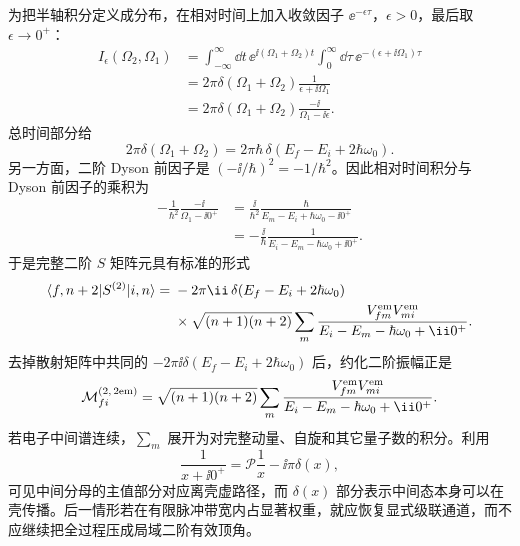 \begin{derivation}
为把半轴积分定义成分布，在相对时间上加入收敛因子 $\ee^{-\epsilon\tau}$，$\epsilon>0$，最后取 $\epsilon\to0^+$：
\begin{align*}
 I_\epsilon(\Omega_2,\Omega_1)
 &=\int_{-\infty}^{\infty}\dd t\,
   \ee^{\ii(\Omega_1+\Omega_2)t}
   \int_0^\infty\dd\tau\,
   \ee^{-(\epsilon+\ii\Omega_1)\tau}\\
 &=2\pi\delta(\Omega_1+\Omega_2)
   \frac1{\epsilon+\ii\Omega_1}\\
 &=2\pi\delta(\Omega_1+\Omega_2)
   \frac{-\ii}{\Omega_1-\ii\epsilon}.
\end{align*}
总时间部分给
\begin{equation*}
2\pi\delta(\Omega_1+\Omega_2)
=2\pi\hbar\,
\delta(E_f-E_i+2\hbar\omega_0).
\end{equation*}
另一方面，二阶 Dyson 前因子是 $(-\ii/\hbar)^2=-1/\hbar^2$。因此相对时间积分与 Dyson 前因子的乘积为
\begin{align*}
 -\frac1{\hbar^2}
 \frac{-\ii}{\Omega_1-\ii0^+}
 &=\frac{\ii}{\hbar^2}
 \frac{\hbar}{E_m-E_i+\hbar\omega_0-\ii0^+}\\
 &=-\frac{\ii}{\hbar}
 \frac1{E_i-E_m-\hbar\omega_0+\ii0^+}.
\end{align*}
于是完整二阶 $S$ 矩阵元具有标准的形式
\begin{align*}
 \langle f,n+2|S^{(2)}|i,n\rangle
 ={}&-2\pi\ii\,
 \delta(E_f-E_i+2\hbar\omega_0)\\
 &\times\sqrt{(n+1)(n+2)}
 \sum_m
 \frac{V^{\rm em}_{fm}V^{\rm em}_{mi}}
 {E_i-E_m-\hbar\omega_0+\ii0^+}.
\end{align*}
去掉散射矩阵中共同的 $-2\pi\ii\delta(E_f-E_i+2\hbar\omega_0)$ 后，约化二阶振幅正是
\[
\mathcal M_{fi}^{(2,\,2{\rm em})}
=\sqrt{(n+1)(n+2)}
\sum_m
\frac{V^{\rm em}_{fm}V^{\rm em}_{mi}}
{E_i-E_m-\hbar\omega_0+\ii0^+}.
\]
若电子中间谱连续，$\sum_m$ 展开为对完整动量、自旋和其它量子数的积分。利用
\[
\frac1{x+\ii0^+}
=\mathcal P\frac1x-\ii\pi\delta(x),
\]
可见中间分母的主值部分对应离壳虚路径，而 $\delta(x)$ 部分表示中间态本身可以在壳传播。后一情形若在有限脉冲带宽内占显著权重，就应恢复显式级联通道，而不应继续把全过程压成局域二阶有效顶角。
\end{derivation}



